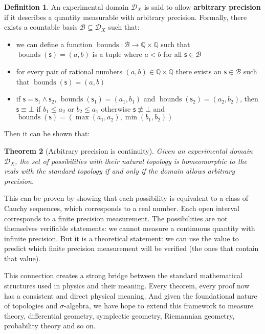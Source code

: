 \documentclass[letterpaper]{article}
\theoremstyle{plain}%
\newtheorem{thrm}{Theorem}[section]
\theoremstyle{definition}
\newtheorem{defn}[thrm]{Definition}
\theoremstyle{remark}
\def\contradiction{\bot}
\def\AND{\wedge}
\newcommand{\stmt}[1][s] {\mathsf{#1}}
\newcommand{\obs}[1][s] {\mathsf{#1}}
\newcommand{\edomain}[1][D] {\mathcal{#1}}
\newcommand{\basis}[1][B] {\mathcal{#1}} %
\begin{document}
\begin{defn}
	An experimental domain $\edomain_X$ is said to allow \textbf{arbitrary precision} if it describes a quantity measurable with arbitrary precision. Formally, there exists a countable basis $\basis \subseteq \edomain_X$ such that:
	\begin{itemize}
		\item we can define a function $\operatorname{bounds} : \basis \to \mathbb{Q} \times \mathbb{Q}$ such that $\operatorname{bounds}(\stmt) = (a, b)$ is a tuple where $a < b$ for all $\stmt \in \basis$
		\item for every pair of rational numbers $(a, b) \in \mathbb{Q} \times \mathbb{Q}$ there exists an $\obs \in \basis$ such that $\operatorname{bounds}(\stmt) = (a, b)$
		\item if $\stmt = \stmt_1 \AND \stmt_2$, $\operatorname{bounds}(\stmt_1) = (a_1, b_1)$ and $\operatorname{bounds}(\stmt_2) = (a_2, b_2)$, then $\stmt \equiv \contradiction$ if $b_1 \leq a_2$ or $b_2 \leq a_1$ otherwise $\stmt \nequiv \contradiction$ and $\operatorname{bounds}(\stmt) = (\max(a_1, a_2), \min(b_1, b_2))$
	\end{itemize}
\end{defn}

Then it can be shown that:

\begin{thrm}[Arbitrary precision is continuity]\label{thrm_arbitrary_precision_is_continuity}
	Given an experimental domain $\edomain_X$, the set of possibilities with their natural topology is homeomorphic to the reals with the standard topology if and only if the domain allows arbitrary precision.
\end{thrm}

This can be proven by showing that each possibility is equivalent to a class of Cauchy sequences, which corresponds to a real number. Each open interval corresponds to a finite precision measurement. The possibilities are not themselves verifiable statements: we cannot measure a continuous quantity with infinite precision. But it is a theoretical statement: we can use the value to predict which finite precision measurement will be verified (the ones that contain that value).

This connection creates a strong bridge between the standard mathematical structures used in physics and their meaning. Every theorem, every proof now has a consistent and direct physical meaning. And given the foundational nature of topologies and $\sigma$-algebra, we have hope to extend this framework to measure theory, differential geometry, symplectic geometry, Riemannian geometry, probability theory and so on.
\end{document}
